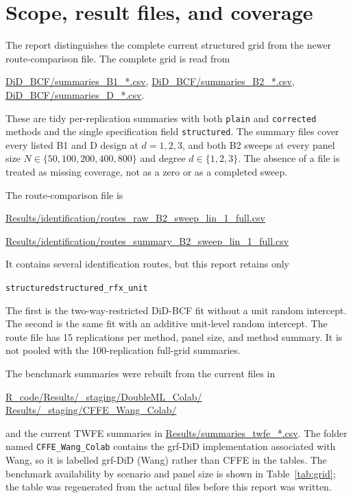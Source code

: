 \documentclass[11pt]{article}
\begin{document}
\tableofcontents

\section{Scope, result files, and coverage}

The report distinguishes the complete current structured grid from the newer
route-comparison file. The complete grid is read from
\begin{center}
\url{DiD_BCF/summaries_B1_*.csv},\quad
\url{DiD_BCF/summaries_B2_*.csv},\quad
\url{DiD_BCF/summaries_D_*.csv}.
\end{center}
These are tidy per-replication summaries with both \texttt{plain} and
\texttt{corrected} methods and the single specification field
\texttt{structured}. The summary files cover every listed B1 and D design at
$d=1,2,3$, and both B2 sweeps at every panel size
$N\in\{50,100,200,400,800\}$ and degree $d\in\{1,2,3\}$. The absence of a
file is treated as missing coverage, not as a zero or as a completed sweep.

The route-comparison file is
\begin{center}
\url{Results/identification/routes_raw_B2_sweep_lin_1_full.csv}\par
\url{Results/identification/routes_summary_B2_sweep_lin_1_full.csv}
\end{center}
It contains several identification routes, but this report retains only
\begin{center}
\texttt{structured}\qquad \texttt{structured\_rfx\_unit}
\end{center}
The first is the two-way-restricted DiD-BCF fit without a unit random
intercept. The second is the same fit with an additive unit-level random
intercept. The route file has
15 replications per method, panel size, and method summary. It is not pooled
with the 100-replication full-grid summaries.

The benchmark summaries were rebuilt from the current files in
\begin{center}
\url{R_code/}\qquad \url{Results/_staging/DoubleML_Colab/}\qquad
\url{Results/_staging/CFFE_Wang_Colab/}
\end{center}
and the current TWFE summaries in \url{Results/summaries_twfe_*.csv}. The
folder named \texttt{CFFE\_Wang\_Colab} contains the grf-DiD implementation
associated with Wang, so it is labelled grf-DiD (Wang) rather than CFFE in the
tables. The benchmark availability by scenario and panel size is shown in
Table~\ref{tab:grid}; the table was regenerated from the actual files before
this report was written.
\end{document}
